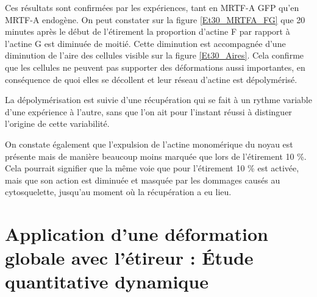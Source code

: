 Ces résultats sont confirmées par les expériences, tant en MRTF-A GFP qu'en MRTF-A endogène. On peut constater sur la figure \ref{Et30_MRTFA_FG} que 20 minutes après le début de l'étirement la proportion d'actine F par rapport à l'actine G est diminuée de moitié. Cette diminution est accompagnée d'une diminution de l'aire des cellules visible sur la figure \ref{Et30_Aires}. Cela confirme que les cellules ne peuvent pas supporter des déformations aussi importantes, en conséquence de quoi elles se décollent et leur réseau d'actine est dépolymérisé. 

La dépolymérisation est suivie d'une récupération qui se fait à un rythme variable d'une expérience à l'autre, sans que l'on ait pour l'instant réussi à distinguer l'origine de cette variabilité. 

On constate également que l'expulsion de l'actine monomérique du noyau est présente mais de manière beaucoup moins marquée que lors de l'étirement 10 \%. Cela pourrait signifier que la même voie que pour l'étirement 10 \% est activée, mais que son action est diminuée et masquée par les dommages causés au cytosquelette, jusqu'au moment où la récupération a eu lieu. 

\section{Application d'une déformation globale avec l'étireur : \'Etude quantitative dynamique}














%